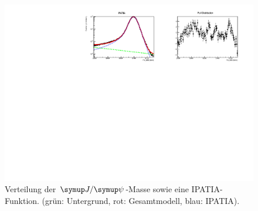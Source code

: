 %
\begin{figure}[H]
  \centering
      \includegraphics[width=\textwidth]{Plots/IPATIAexp.pdf}
  \caption{Verteilung der $\jpsi$-Masse sowie eine IPATIA-Funktion. (grün: Untergrund, rot: Gesamtmodell, blau: IPATIA).}
  \label{fig:fit2}
\end{figure}
